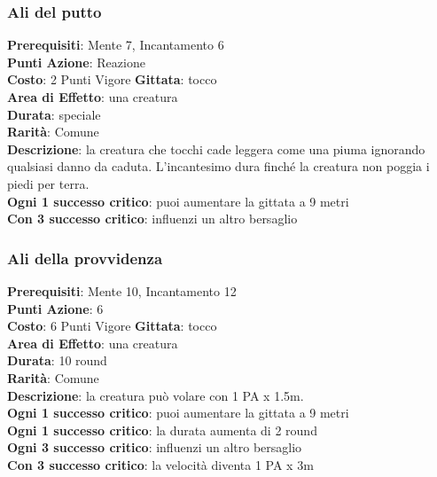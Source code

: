 \documentclass[12pt,a4paper,twoside,openany]{book}
\begin{document}
\begin{multicols}{2}


\subsubsection*{Ali del putto}
\textbf{Prerequisiti}: Mente 7, Incantamento 6\\
\textbf{Punti Azione}: Reazione\\
\textbf{Costo}: 2 Punti Vigore
\textbf{Gittata}: tocco \\
\textbf{Area di Effetto}: una creatura\\
\textbf{Durata}: speciale\\
\textbf{Rarità}: Comune\\
\textbf{Descrizione}: la creatura che tocchi cade leggera come una piuma ignorando qualsiasi danno da caduta. L'incantesimo dura finché la creatura non poggia i piedi per terra.\\
\textbf{Ogni 1 successo critico}: puoi aumentare la gittata a 9 metri\\
\textbf{Con 3 successo critico}: influenzi un altro bersaglio

\subsubsection*{Ali della provvidenza}
\textbf{Prerequisiti}: Mente 10, Incantamento 12\\
\textbf{Punti Azione}: 6\\
\textbf{Costo}: 6 Punti Vigore
\textbf{Gittata}: tocco \\
\textbf{Area di Effetto}: una creatura\\
\textbf{Durata}: 10 round\\
\textbf{Rarità}: Comune\\
\textbf{Descrizione}: la creatura può volare con 1 PA x 1.5m.\\
\textbf{Ogni 1 successo critico}: puoi aumentare la gittata a 9 metri\\
\textbf{Ogni 1 successo critico}: la durata aumenta di 2 round\\
\textbf{Ogni 3 successo critico}: influenzi un altro bersaglio\\
\textbf{Con 3 successo critico}: la velocità diventa 1 PA x 3m



\end{multicols}
\end{document}
